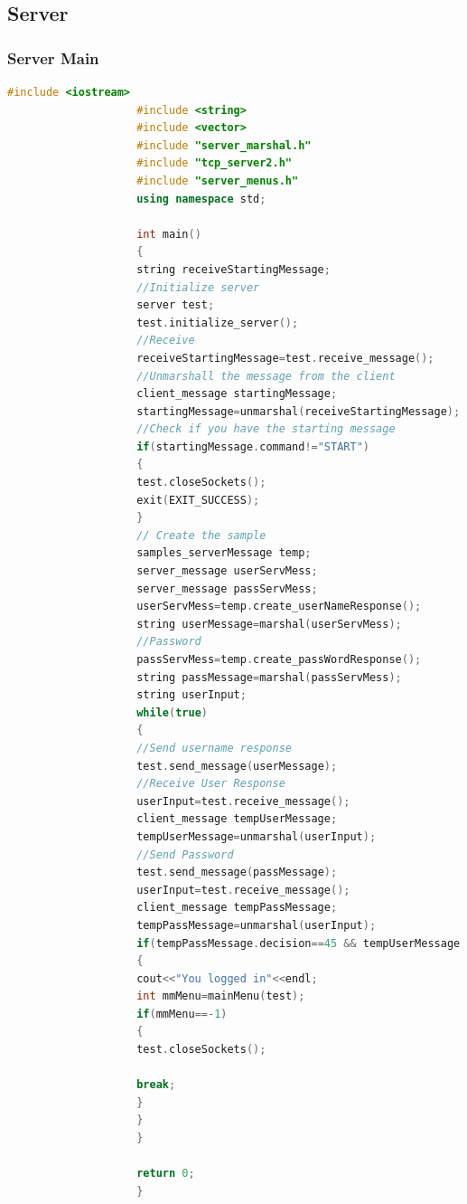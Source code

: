 \documentclass[11pt]{article}
\begin{document}
		\subsection{Server}
			\subsubsection{Server Main}
				\begin{lstlisting}[language=c++]
					#include <iostream>
					#include <string>
					#include <vector>
					#include "server_marshal.h"
					#include "tcp_server2.h"
					#include "server_menus.h"
					using namespace std;
					
					int main()
					{
					string receiveStartingMessage;
					//Initialize server
					server test;
					test.initialize_server();
					//Receive
					receiveStartingMessage=test.receive_message();
					//Unmarshall the message from the client
					client_message startingMessage;
					startingMessage=unmarshal(receiveStartingMessage);
					//Check if you have the starting message
					if(startingMessage.command!="START")
					{
					test.closeSockets();
					exit(EXIT_SUCCESS);
					}
					// Create the sample
					samples_serverMessage temp;
					server_message userServMess;
					server_message passServMess;
					userServMess=temp.create_userNameResponse();
					string userMessage=marshal(userServMess);
					//Password
					passServMess=temp.create_passWordResponse();
					string passMessage=marshal(passServMess);
					string userInput;
					while(true)
					{
					//Send username response
					test.send_message(userMessage);
					//Receive User Response
					userInput=test.receive_message();
					client_message tempUserMessage;
					tempUserMessage=unmarshal(userInput);
					//Send Password
					test.send_message(passMessage);
					userInput=test.receive_message();
					client_message tempPassMessage;
					tempPassMessage=unmarshal(userInput);
					if(tempPassMessage.decision==45 && tempUserMessage.decision==7)
					{
					cout<<"You logged in"<<endl;
					int mmMenu=mainMenu(test);
					if(mmMenu==-1)
					{
					test.closeSockets();
					
					break;
					}
					}
					}
					
					return 0;
					}
				\end{lstlisting}
\end{document}
